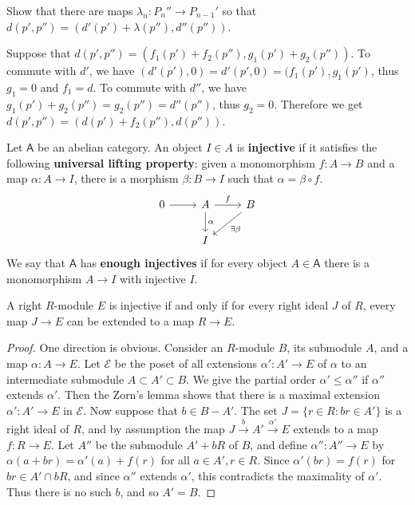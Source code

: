 \begin{exer} Show that there are maps $\lambda_n:P_n''\rightarrow P_{n-1}'$ so that $d(p',p'')=(d'(p')+\lambda(p''),d''(p''))$.
\end{exer}
\begin{solution} Suppose that $d(p',p'')=(f_1(p')+f_2(p''),g_1(p')+g_2(p''))$. To commute with $d'$, we have $(d'(p'),0)=d'(p',0)=(f_1(p'),g_1(p')$, thus $g_1=0$ and $f_1=d$. To commute with $d''$, we have $g_1(p')+g_2(p'')=g_2(p'')=d''(p'')$, thus $g_2=0$. Therefore we get $d(p',p'')=(d(p')+f_2(p''),d(p''))$.
\end{solution}

\begin{defn} Let $\mathsf{A}$ be an abelian category. An object $I\in A$ is \textbf{injective} if it satisfies the following \textbf{universal lifting property}: given a monomorphism $f:A\rightarrow B$ and a map $\alpha:A\rightarrow I$, there is a morphism $\beta:B\rightarrow I$ such that $\alpha=\beta\circ f$.
\begin{equation}
\begin{tikzcd}
0\arrow[r] & A\arrow{r}{f}\arrow{d}{\alpha} & B\arrow{ld}{\exists \beta}\\
&I&
\end{tikzcd}
\end{equation}
We say that $\mathsf{A}$ has \textbf{enough injectives} if for every object $A\in \mathsf{A}$ there is a monomorphism $A\rightarrow I$ with injective $I$.
\end{defn}

\begin{thm} A right $R$-module $E$ is injective if and only if for every right ideal $J$ of $R$, every map $J\rightarrow E$ can be extended to a map $R\rightarrow E$.
\end{thm}
\begin{proof}
One direction is obvious. Consider an $R$-module $B$, its submodule $A$, and a map $\alpha:A\rightarrow E$. Let $\mathcal{E}$ be the poset of all extensions $\alpha':A'\rightarrow E$ of $\alpha$ to an intermediate submodule $A\subset A'\subset B$. We give the partial order $\alpha'\leq \alpha''$ if $\alpha''$ extends $\alpha'$. Then the Zorn's lemma shows that there is a maximal extension $\alpha':A'\rightarrow E$ in $\mathcal{E}$. Now suppose that $b\in B-A'$. The set $J=\{r\in R:br\in A'\}$ is a right ideal of $R$, and by assumption the map $J\xrightarrow{b} A'\xrightarrow{\alpha'} E$ extends to a map $f:R\rightarrow E$. Let $A''$ be the submodule $A'+bR$ of $B$, and define $\alpha'':A''\rightarrow E$ by $\alpha(a+br)=\alpha'(a)+f(r)$ for all $a\in A',r\in R$. Since $\alpha'(br)=f(r)$ for $br\in A'\cap bR$, and since $\alpha''$ extends $\alpha'$, this contradicts the maximality of $\alpha'$. Thus there is no such $b$, and so $A'=B$.
\end{proof}

